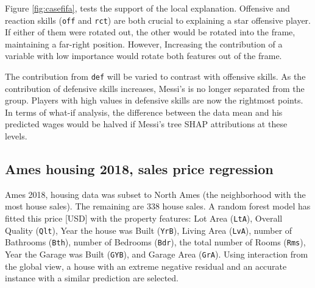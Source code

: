 \documentclass[
]{article}
\begin{document}
Figure \ref{fig:casefifa}, tests the support of the local explanation. Offensive and reaction skills (\texttt{off} and \texttt{rct}) are both crucial to explaining a star offensive player. If either of them were rotated out, the other would be rotated into the frame, maintaining a far-right position. However, Increasing the contribution of a variable with low importance would rotate both features out of the frame.

The contribution from \texttt{def} will be varied to contrast with offensive skills. As the contribution of defensive skills increases, Messi's is no longer separated from the group. Players with high values in defensive skills are now the rightmost points. In terms of what-if analysis, the difference between the data mean and his predicted wages would be halved if Messi's tree SHAP attributions at these levels.

\hypertarget{ames-housing-2018-sales-price-regression}{%
\subsection{Ames housing 2018, sales price regression}\label{ames-housing-2018-sales-price-regression}}

Ames 2018, housing data was subset to North Ames (the neighborhood with the most house sales). The remaining are 338 house sales. A random forest model has fitted this price {[}USD{]} with the property features: Lot Area (\texttt{LtA}), Overall Quality (\texttt{Qlt}), Year the house was Built (\texttt{YrB}), Living Area (\texttt{LvA}), number of Bathrooms (\texttt{Bth}), number of Bedrooms (\texttt{Bdr}), the total number of Rooms (\texttt{Rms}), Year the Garage was Built (\texttt{GYB}), and Garage Area (\texttt{GrA}). Using interaction from the global view, a house with an extreme negative residual and an accurate instance with a similar prediction are selected.
\end{document}
